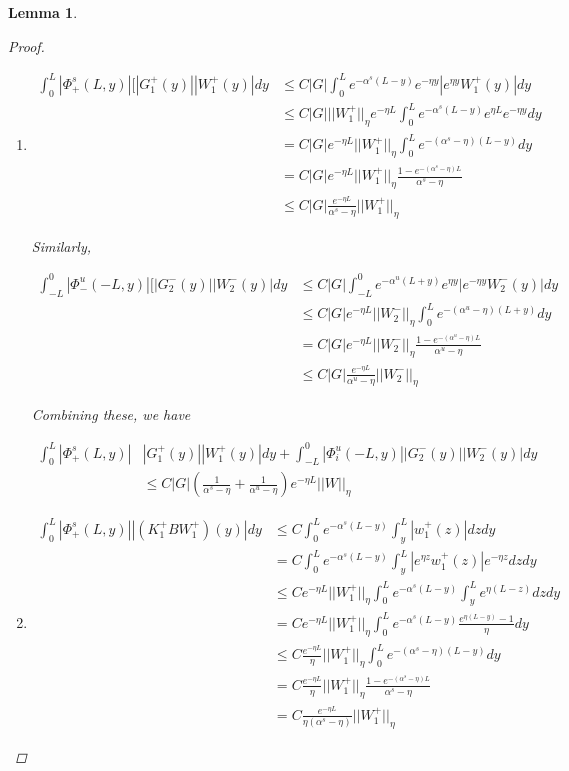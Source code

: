 \documentclass[12pt]{article}
\newtheorem{lemma}{Lemma}
\begin{document}
\begin{lemma}
\begin{proof}
\begin{enumerate}
\item
\begin{align*}
\int_0^L |\Phi^s_+(L, y)|[|G_1^+(y)||W_1^+(y)| dy &\leq C|G| \int_0^L e^{-\alpha^s(L-y)}e^{-\eta y}|e^{\eta y}W_1^+(y)| dy \\
&\leq C|G|||W_1^+||_\eta e^{-\eta L} \int_0^L e^{-\alpha^s(L-y)}e^{\eta L} e^{-\eta y} dy \\
&= C|G| e^{-\eta L}||W_1^+||_\eta \int_0^L e^{-(\alpha^s - \eta)(L-y)} dy \\
&= C|G| e^{-\eta L} ||W_1^+||_\eta \frac{1 - e^{-(\alpha^s - \eta)L}}{\alpha^s - \eta}\\
&\leq C|G| \frac{ e^{-\eta L} }{\alpha^s - \eta} ||W_1^+||_\eta
\end{align*}

Similarly,

\begin{align*}
\int_{-L}^0 |\Phi^u_-(-L, y)|[|G_2^-(y)||W_2^-(y)| dy &\leq C|G| \int_{-L}^0  e^{-\alpha^u(L+y)}e^{\eta y}|e^{-\eta y}W_2^-(y)| dy \\
&\leq C|G| e^{-\eta L}||W_2^-||_\eta \int_0^L e^{-(\alpha^u - \eta)(L+y)} dy \\
&= C|G| e^{-\eta L} ||W_2^-||_\eta \frac{1 - e^{-(\alpha^u - \eta)L}}{\alpha^u - \eta}\\
&\leq C|G| \frac{ e^{-\eta L} }{\alpha^u - \eta} ||W_2^-||_\eta
\end{align*}

Combining these, we have

\begin{align*}
\int_0^L |\Phi^s_+(L, y)|&|G_1^+(y)||W_1^+(y)| dy + \int_{-L}^0 |\Phi^u_i(-L, y)||G_2^-(y)||W_2^-(y)| dy \\
&\leq C|G| \left( \frac{1}{\alpha^s - \eta} + \frac{1}{\alpha^u - \eta} \right) e^{-\eta L}||W||_\eta
\end{align*}

\item

\begin{align*}
\int_0^L |\Phi^s_+(L, y)||(K_1^+ B W_1^+)(y)| dy &\leq C \int_0^L e^{-\alpha^s(L-y)}\int_y^L|w_1^+(z)|dz dy \\
&= C \int_0^L e^{-\alpha^s(L-y)}\int_y^L|e^{\eta z} w_1^+(z)|e^{-\eta z} dz dy \\
&\leq C e^{-\eta L} ||W_1^+||_\eta \int_0^L e^{-\alpha^s(L-y)}\int_y^L e^{\eta(L-z)} dz dy \\
&= C e^{-\eta L} ||W_1^+||_\eta \int_0^L e^{-\alpha^s(L-y)} \frac{e^{\eta(L - y)} - 1}{\eta} dy \\
&\leq C \frac{e^{-\eta L}}{\eta} ||W_1^+||_\eta \int_0^L e^{-(\alpha^s-\eta)(L-y)} dy \\
&= C \frac{e^{-\eta L}}{\eta} ||W_1^+||_\eta \frac{1 - e^{-(\alpha^s - \eta)L}}{\alpha^s - \eta} \\
&= C \frac{e^{-\eta L}}{\eta(\alpha^s - \eta)} ||W_1^+||_\eta
\end{align*}


\end{enumerate}
\end{proof}
\end{lemma}
\end{document}
